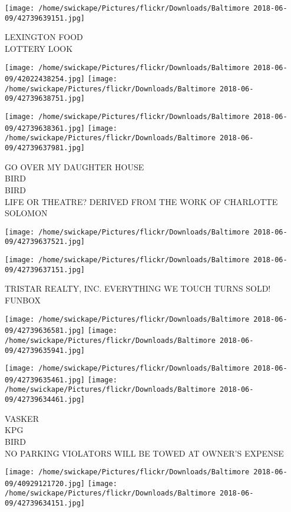 \documentclass[10pt,letterpaper]{article}
\begin{document}
\vspace{0.25in}
\texttt{[image: /home/swickape/Pictures/flickr/Downloads/Baltimore 2018-06-09/42739639151.jpg]}

LEXINGTON FOOD\\
LOTTERY LOOK
\pagebreak

\texttt{[image: /home/swickape/Pictures/flickr/Downloads/Baltimore 2018-06-09/42022438254.jpg]}
\texttt{[image: /home/swickape/Pictures/flickr/Downloads/Baltimore 2018-06-09/42739638751.jpg]}

\texttt{[image: /home/swickape/Pictures/flickr/Downloads/Baltimore 2018-06-09/42739638361.jpg]}
\texttt{[image: /home/swickape/Pictures/flickr/Downloads/Baltimore 2018-06-09/42739637981.jpg]}

GO OVER MY DAUGHTER HOUSE\\
BIRD\\
BIRD\\
LIFE OR THEATRE? DERIVED FROM THE WORK OF CHARLOTTE SOLOMON
\pagebreak

\texttt{[image: /home/swickape/Pictures/flickr/Downloads/Baltimore 2018-06-09/42739637521.jpg]}

\vspace{0.25in}
\texttt{[image: /home/swickape/Pictures/flickr/Downloads/Baltimore 2018-06-09/42739637151.jpg]}

TRISTAR REALTY, INC. EVERYTHING WE TOUCH TURNS SOLD!\\
FUNBOX
\pagebreak

\texttt{[image: /home/swickape/Pictures/flickr/Downloads/Baltimore 2018-06-09/42739636581.jpg]}
\texttt{[image: /home/swickape/Pictures/flickr/Downloads/Baltimore 2018-06-09/42739635941.jpg]}

\texttt{[image: /home/swickape/Pictures/flickr/Downloads/Baltimore 2018-06-09/42739635461.jpg]}
\texttt{[image: /home/swickape/Pictures/flickr/Downloads/Baltimore 2018-06-09/42739634461.jpg]}

VASKER\\
KPG\\
BIRD\\
NO PARKING VIOLATORS WILL BE TOWED AT OWNER'S EXPENSE
\pagebreak

\texttt{[image: /home/swickape/Pictures/flickr/Downloads/Baltimore 2018-06-09/40929121720.jpg]}
\texttt{[image: /home/swickape/Pictures/flickr/Downloads/Baltimore 2018-06-09/42739634151.jpg]}
\end{document}

